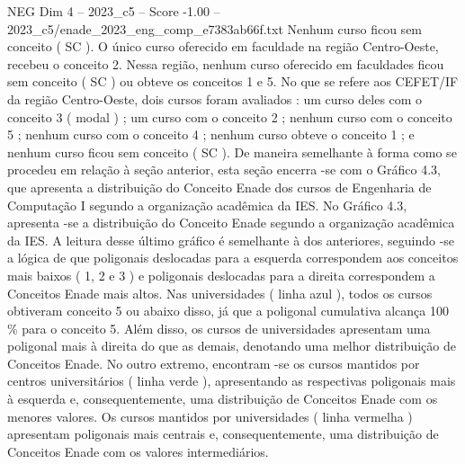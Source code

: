 \begin{textsample}{NEG Dim 4 – 2023\_c5 – Score -1.00 – 2023\_c5/enade\_2023\_eng\_comp\_e7383ab66f.txt}
Nenhum curso ficou sem conceito ( SC ).
O único curso oferecido em faculdade na região Centro-Oeste, recebeu o conceito 2.
Nessa região, nenhum curso oferecido em faculdades ficou sem conceito ( SC ) ou obteve os conceitos 1 e 5.
No que se refere aos CEFET/IF da região Centro-Oeste, dois cursos foram avaliados : um curso deles com o conceito 3 ( modal ) ; um curso com o conceito 2 ; nenhum curso com o conceito 5 ; nenhum curso com o conceito 4 ; nenhum curso obteve o conceito 1 ; e nenhum curso ficou sem conceito ( SC ).
De maneira semelhante à forma como se procedeu em relação à seção anterior, esta seção encerra -se com o Gráfico 4.3, que apresenta a distribuição do Conceito Enade dos cursos de Engenharia de Computação I segundo a organização acadêmica da IES.
No Gráfico 4.3, apresenta -se a distribuição do Conceito Enade segundo a organização acadêmica da IES.
A leitura desse último gráfico é semelhante à dos anteriores, seguindo -se a lógica de que poligonais deslocadas para a esquerda correspondem aos conceitos mais baixos ( 1, 2 e 3 ) e poligonais deslocadas para a direita correspondem a Conceitos Enade mais altos.
Nas universidades ( linha azul ), todos os cursos obtiveram conceito 5 ou abaixo disso, já que a poligonal cumulativa alcança 100 \% para o conceito 5.
Além disso, os cursos de universidades apresentam uma poligonal mais à direita do que as demais, denotando uma melhor distribuição de Conceitos Enade.
No outro extremo, encontram -se os cursos mantidos por centros universitários ( linha verde ), apresentando as respectivas poligonais mais à esquerda e, consequentemente, uma distribuição de Conceitos Enade com os menores valores.
Os cursos mantidos por universidades ( linha vermelha ) apresentam poligonais mais centrais e, consequentemente, uma distribuição de Conceitos Enade com os valores intermediários.

\end{textsample}
